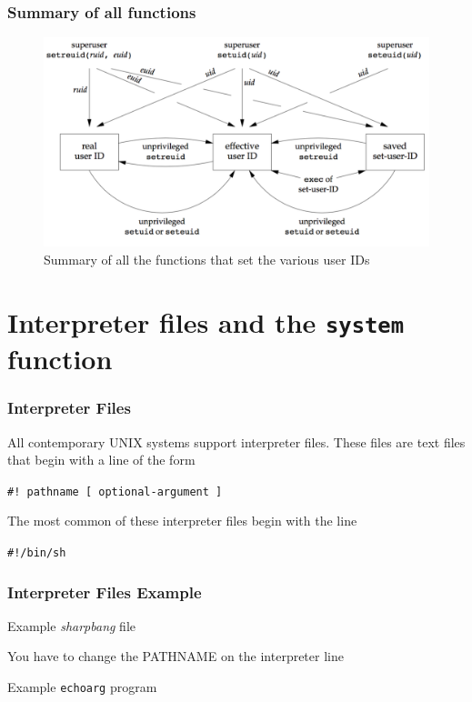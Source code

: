\documentclass[newPxFont,sthlmFooter,nooffset]{beamer}
\begin{document}
\begin{frame}
  \frametitle{Summary of all functions}
  \begin{figure}[h]
    \centering
    \includegraphics[width=\linewidth]{figure/fig8-19_summary.png}
    \caption{Summary of all the functions that set the various user IDs}
    \label{fig:summary}
  \end{figure}
\end{frame}







\section{Interpreter files and the \texttt{system} function}
\begin{frame}[t]
  \frametitle{Interpreter Files}
All contemporary UNIX systems support interpreter files. These files are text files that begin with a line of the form

\texttt{\#! pathname [ optional-argument ]}

The most common of these interpreter files begin with the line

\texttt{\#!/bin/sh}
  
\end{frame}

\begin{frame}[containsverbatim,t]
  \frametitle{Interpreter Files Example}

Example \textit{sharpbang} file


You have to change the PATHNAME on the interpreter line

Example \texttt{echoarg} program

\end{frame}
\end{document}
